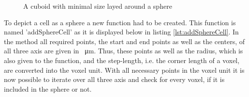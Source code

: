 \begin{figure}[ht]
\begin{center}
\caption[A cuboid with minimal size layed around a sphere in two dimensions]{A cuboid with minimal size layed around a sphere}
\label{tikz:CuboidSphere}
\end{center}
\end{figure}

To depict a cell as a sphere a new function had to be created. This function is named 'addSphereCell' as it is displayed below in listing \ref{lst:addSphereCell}. In the method all required points, the start and end points as well as the centers, of all three axis are given in \SI{}{\micro\metre}. Thus, these points as well as the radius, which is also given to the function, and the step-length, i.e. the corner length of a voxel, are converted into the voxel unit. \newline
With all necessary points in the voxel unit it is now possible to iterate over all three axis and check for every voxel, if it is included in the sphere or not. \newpage




